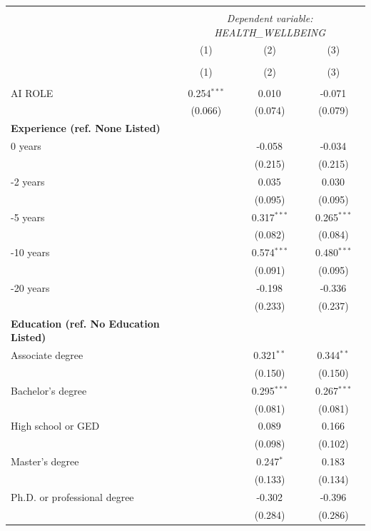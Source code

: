 \begin{table}[!htbp] \centering
\begin{tabular}{@{\extracolsep{5pt}}lccc}
\\[-1.8ex]\hline
\hline \\[-1.8ex]
& \multicolumn{3}{c}{\textit{Dependent variable: HEALTH_WELLBEING}} \
\cr \cline{2-4}
\\[-1.8ex] & \multicolumn{1}{c}{(1)} & \multicolumn{1}{c}{(2)} & \multicolumn{1}{c}{(3)}  \\
\\[-1.8ex] & (1) & (2) & (3) \\
\hline \\[-1.8ex]
 AI ROLE & 0.254$^{***}$ & 0.010$^{}$ & -0.071$^{}$ \\
& (0.066) & (0.074) & (0.079) \\
 \textbf{Experience (ref. None Listed)}\\
0 years & & -0.058$^{}$ & -0.034$^{}$ \\
& & (0.215) & (0.215) \\
 \quad 1-2 years & & 0.035$^{}$ & 0.030$^{}$ \\
& & (0.095) & (0.095) \\
 \quad 3-5 years & & 0.317$^{***}$ & 0.265$^{***}$ \\
& & (0.082) & (0.084) \\
 \quad 6-10 years & & 0.574$^{***}$ & 0.480$^{***}$ \\
& & (0.091) & (0.095) \\
 \quad 11-20 years & & -0.198$^{}$ & -0.336$^{}$ \\
& & (0.233) & (0.237) \\
 \textbf{Education (ref. No Education Listed)}\\
Associate degree & & 0.321$^{**}$ & 0.344$^{**}$ \\
& & (0.150) & (0.150) \\
 \quad Bachelor's degree & & 0.295$^{***}$ & 0.267$^{***}$ \\
& & (0.081) & (0.081) \\
 \quad High school or GED & & 0.089$^{}$ & 0.166$^{}$ \\
& & (0.098) & (0.102) \\
 \quad Master's degree & & 0.247$^{*}$ & 0.183$^{}$ \\
& & (0.133) & (0.134) \\
 \quad Ph.D. or professional degree & & -0.302$^{}$ & -0.396$^{}$ \\
& & (0.284) & (0.286) \\

\end{tabular}
\end{table}
